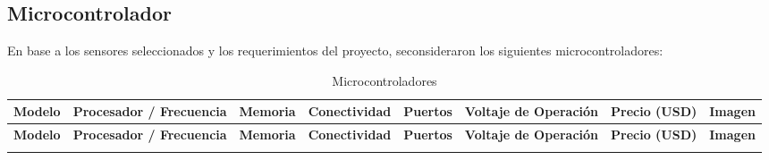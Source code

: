 \subsection{Microcontrolador}
En base a los sensores seleccionados y los requerimientos del proyecto, seconsideraron los siguientes microcontroladores:
\begin{landscape}
\begingroup
\setlength{\tabcolsep}{5pt} %
\renewcommand{\arraystretch}{1.5} %
\begin{longtable}{|p{2.5cm}|p{2.5cm}|p{2.5cm}|p{2.5cm}|p{2cm}|p{2cm}|p{1.5cm}|m{2cm}|}
\caption{Microcontroladores}
\label{tab:microcontroladores}
\\
\hline
\textbf{Modelo} & \textbf{Procesador / Frecuencia} & \textbf{Memoria} & \textbf{Conectividad} & \textbf{Puertos} & \textbf{Voltaje de Operación} & \textbf{Precio (USD)} & \textbf{Imagen} \\
\hline
\endfirsthead
\hline
\textbf{Modelo} & \textbf{Procesador / Frecuencia} & \textbf{Memoria} & \textbf{Conectividad} & \textbf{Puertos} & \textbf{Voltaje de Operación} & \textbf{Precio (USD)} & \textbf{Imagen} \\
\hline
\endhead
\hline
\endfoot
\endlastfoot


\end{longtable}
\end{landscape}
